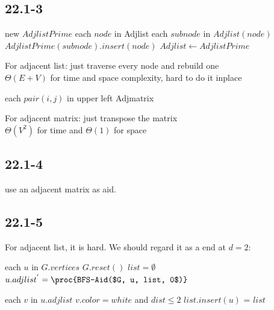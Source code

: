 \documentclass[]{article}
\begin{document}
\subsection{22.1-3}

\begin{codebox}
	\li new $AdjlistPrime$
	\li \For each $node$ in Adjlist
	\li		\Do \For each $subnode$ in $Adjlist(node)$
	\li 		\Do $AdjlistPrime(subnode).insert(node)$
	\li $Adjlist \gets AdjlistPrime$
	\End
\end{codebox}

For adjacent list: just traverse every node and rebuild one\\
$\Theta (E+V)$ for time and space complexity, hard to do it inplace\\

\begin{codebox}
	\li \For each $pair(i,j)$ in upper left Adjmatrix
	\li		\Do {}
	\End
\end{codebox}

For adjacent matrix: just transpose the matrix\\
$\Theta (V^2)$ for time and $\Theta(1)$ for space

\subsection{22.1-4}
use an adjacent matrix as aid.

\subsection{22.1-5}

For adjacent list, it is hard. We should regard it as a  end at $d = 2$:

\begin{codebox}
	
	\li \For each $u$ in $G.vertices$
	\li 	\Do $G.reset()$
	\li     $list = \emptyset$
	\li 	$u.adjlist^{'} = \proc{BFS-Aid($G, u, list, 0$)}$
	\End
	\End
\end{codebox}

\begin{codebox}
	
	\li \For each $v$ in $u.adjlist$
	\li 	\Do \If $v.color = white$ and $dist \le 2$ 
	\li			\Then $list.insert(u)$
	\li 		{}
	\End=
	\End
	\li \Return $list$
\end{codebox}
\end{document}
